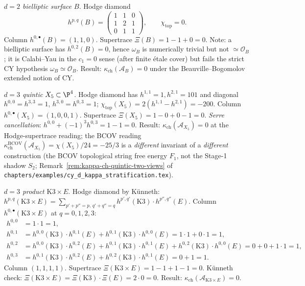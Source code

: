 \emph{$d = 2$ bielliptic surface $B$}. Hodge diamond
\[
 h^{p, q}(B) =
 \begin{pmatrix}
    1 & 1 & 0 \\
    1 & 2 & 1 \\
    0 & 1 & 1
 \end{pmatrix}, \qquad
 \chi_{\mathrm{top}} = 0.
\]
Column $h^{0, \bullet}(B) = (1, 1, 0)$. Supertrace $\Xi(B) = 1 - 1 +
0 = 0$. Note: a bielliptic surface has $h^{0, 2}(B) = 0$, hence
$\omega_B$ is numerically trivial but not $\simeq \mathcal{O}_B$; it
is Calabi--Yau in the $c_1 = 0$ sense (after finite \'etale cover) but
fails the strict CY hypothesis
$\omega_B \simeq \mathcal{O}_B$. Result:
$\kappa_{\mathrm{ch}}(\mathcal{A}_B) = 0$ under the
Beauville--Bogomolov extended notion of CY.

\emph{$d = 3$ quintic $X_5 \subset \P^4$}. Hodge diamond has
$h^{1, 1} = 1, h^{2, 1} = 101$ and diagonal $h^{0, 0} = h^{3, 3} = 1$,
$h^{3, 0} = h^{0, 3} = 1$; $\chi_{\mathrm{top}}(X_5) = 2 (h^{1, 1} -
h^{2, 1}) = -200$. Column $h^{0, \bullet}(X_5) = (1, 0, 0, 1)$.
Supertrace $\Xi(X_5) = 1 - 0 + 0 - 1 = 0$. \emph{Serre cancellation}:
$h^{0, 0} + (-1)^3 h^{0, 3} = 1 - 1 = 0$. Result:
$\kappa_{\mathrm{ch}}(\mathcal{A}_{X_5}) = 0$ at the Hodge-supertrace
reading; the BCOV reading $\kappa_{\mathrm{ch}}^{\mathrm{BCOV}}
(\mathcal{A}_{X_5}) = \chi(X_5)/24 = -25/3$ is a \emph{different}
invariant of a \emph{different} construction (the BCOV topological
string free energy $F_1$, not the Stage-1 shadow $S_2$;
Remark~\ref{rem:kappa-ch-quintic-two-views} of
\texttt{chapters/examples/cy\_d\_kappa\_stratification.tex}).

\emph{$d = 3$ product $\mathrm{K3} \times E$}. Hodge diamond by
K\"unneth:
$h^{p, q}(\mathrm{K3} \times E) = \sum_{p' + p'' = p,\, q' + q'' = q}
h^{p', q'}(\mathrm{K3})\cdot h^{p'', q''}(E)$. Column
$h^{0, \bullet}(\mathrm{K3} \times E)$ at $q = 0, 1, 2, 3$:
\begin{align*}
h^{0, 0} &= 1 \cdot 1 = 1, \\
h^{0, 1} &= h^{0, 0}(\mathrm{K3}) \cdot h^{0, 1}(E) +
           h^{0, 1}(\mathrm{K3}) \cdot h^{0, 0}(E) = 1 \cdot 1 +
           0 \cdot 1 = 1, \\
h^{0, 2} &= h^{0, 0}(\mathrm{K3}) \cdot h^{0, 2}(E) +
           h^{0, 1}(\mathrm{K3}) \cdot h^{0, 1}(E) +
           h^{0, 2}(\mathrm{K3}) \cdot h^{0, 0}(E)
         = 0 + 0 + 1 \cdot 1 = 1, \\
h^{0, 3} &= h^{0, 1}(\mathrm{K3}) \cdot h^{0, 2}(E) +
           h^{0, 2}(\mathrm{K3}) \cdot h^{0, 1}(E) = 0 + 1 = 1.
\end{align*}
Column $(1, 1, 1, 1)$. Supertrace $\Xi(\mathrm{K3} \times E) = 1 - 1
+ 1 - 1 = 0$. K\"unneth check:
$\Xi(\mathrm{K3} \times E) = \Xi(\mathrm{K3}) \cdot \Xi(E) = 2 \cdot
0 = 0$. Result: $\kappa_{\mathrm{ch}}(\mathcal{A}_{\mathrm{K3}
\times E}) = 0$.

